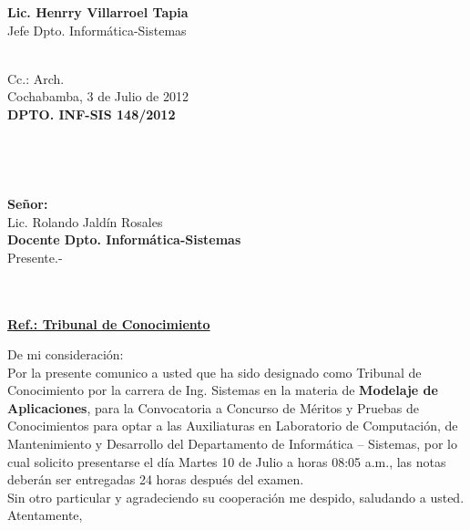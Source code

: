 \documentclass[letterpaper,11pt]{letter}
\begin{document}
\vspace{3.5cm}
\begin{center}
\begin{minipage}[b]{0.5\textwidth}
\begin{center}
{\bf Lic. Henrry Villarroel Tapia}\\
Jefe Dpto. Informática-Sistemas\\
\end{center}
\end{minipage}
\end{center}
~\\
Cc.: Arch.\\
\newpage
Cochabamba, 3 de Julio de 2012~\\
 \textbf{DPTO. INF-SIS 148/2012}\\
~\\
~\\
~\\
~\\
 \textbf{Señor:}~\\
Lic. Rolando Jaldín Rosales~\\
 \textbf{Docente Dpto. Informática-Sistemas}~\\
Presente.-\\
~\\
~\\
\begin{center}
\underline{ \textbf{Ref.: Tribunal de Conocimiento}}
\end{center}
De mi consideración:\\
Por la presente comunico a usted que ha sido designado como Tribunal de Conocimiento por la carrera de Ing. Sistemas en la materia de \textbf{Modelaje de Aplicaciones}, para la Convocatoria a Concurso de Méritos y Pruebas de Conocimientos para optar a las Auxiliaturas en Laboratorio de Computación, de Mantenimiento y Desarrollo del Departamento de Informática – Sistemas, por lo cual solicito presentarse el día Martes 10 de Julio a horas 08:05 a.m., las notas deberán ser entregadas 24 horas después del examen.\\
Sin otro particular y agradeciendo su cooperación me despido, saludando a usted.\\
Atentamente,\\
\end{document}
